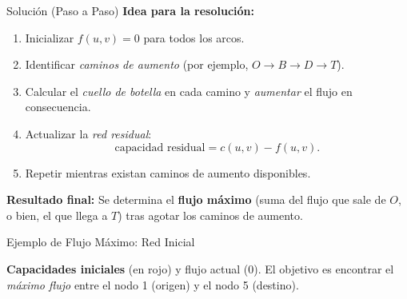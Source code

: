 \documentclass{beamer}
\begin{document}
\begin{frame}{Solución (Paso a Paso)}
\textbf{Idea para la resolución:}
\begin{enumerate}
    \item Inicializar $f(u,v) = 0$ para todos los arcos.
    \item Identificar \textit{caminos de aumento} (por ejemplo, $O \rightarrow B \rightarrow D \rightarrow T$).
    \item Calcular el \textit{cuello de botella} en cada camino y \textit{aumentar} el flujo en consecuencia.
    \item Actualizar la \textit{red residual}: 
    \[
    \text{capacidad residual} = c(u,v) - f(u,v).
    \]
    \item Repetir mientras existan caminos de aumento disponibles.
\end{enumerate}

\textbf{Resultado final:}  
Se determina el \textbf{flujo máximo} (suma del flujo que sale de $O$, o bien, el que llega a $T$) tras agotar los caminos de aumento.

\end{frame}

\begin{frame}{Ejemplo de Flujo Máximo: Red Inicial}
\centering
{}

\vspace{0.5em}
\textbf{Capacidades iniciales} (en rojo) y flujo actual (0). El objetivo es encontrar el \emph{máximo flujo} entre el nodo 1 (origen) y el nodo 5 (destino).
\end{frame}
\end{document}
